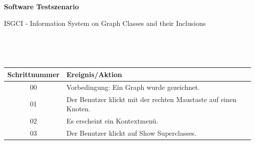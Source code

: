 \vspace*{1cm} 
\begin{center}
\textbf{{\LARGE Software Testszenario}}\\
\end{center}

\begin{center}
{\large ISGCI - Information System on Graph Classes and their Inclusions}\\
\end{center}


$ $\\


	$ $\\

\begin{tabular}{|c|l|}
\hline
\rule{0.00\textwidth}{0.5cm} \textbf{Schrittnummer} & \textbf{Ereignis/Aktion} \hspace{0.55\textwidth} \\[0.25cm]
\hline 
\rule{0.00\textwidth}{0.5cm} 00 & Vorbedingung: Ein Graph wurde gezeichnet. \\[0.25cm]
\hline
 \rule{0.00\textwidth}{0.5cm} 01 & Der Benutzer klickt mit der rechten Maustaste auf einen Knoten. \\[0.25cm]
\hline 
 \rule{0.00\textwidth}{0.5cm} 02 & Es erscheint ein Kontextmenü. \\[0.25cm]
\hline 
 \rule{0.00\textwidth}{0.5cm} 03 & Der Benutzer klickt auf Show Superclasses. \\[0.25cm]
\hline
\end{tabular} \ \\

 \ \\
	
	 \ \\
	
